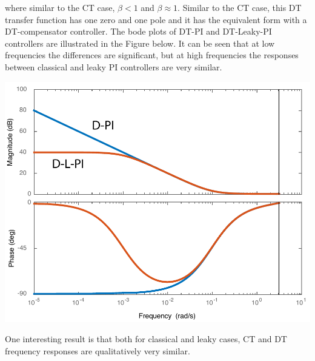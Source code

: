 \documentclass[twoside]{article}
\begin{document}
%
where similar to the CT case, $\beta < 1$ and $\beta \approx 1$.
Similar to the CT case, this DT transfer function has one zero and
one pole and it has the equivalent form with a DT-compensator 
controller. The bode plots of DT-PI and DT-Leaky-PI controllers
are illustrated in the Figure below. It can be seen that
at low frequencies the differences are significant,
but at high frequencies the responses between classical
and leaky PI controllers are very similar.
%
    \begin{center}
\begin{minipage}[h]{0.6\linewidth}
    \begin{center}
      \includegraphics[width=\textwidth]{DPI}
    \end{center}
\end{minipage}
    \end{center}
%
One interesting result is that both for classical and leaky
cases, CT and DT frequency responses are qualitatively very 
similar. 

\end{document}
